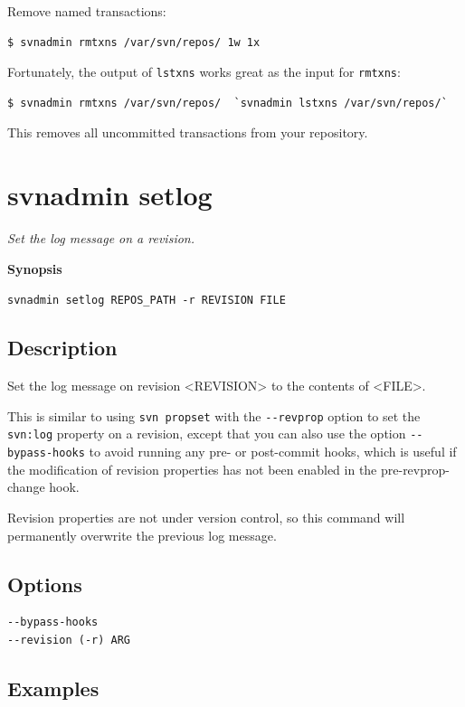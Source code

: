 Remove named transactions:

\begin{verbatim}
$ svnadmin rmtxns /var/svn/repos/ 1w 1x
\end{verbatim}

Fortunately, the output of \texttt{lstxns} works great as the input for
\texttt{rmtxns}:

\begin{verbatim}
$ svnadmin rmtxns /var/svn/repos/  `svnadmin lstxns /var/svn/repos/`
\end{verbatim}

This removes all uncommitted transactions from your repository.

\section{svnadmin setlog}\label{svn.ref.svnadmin.c.setlog}

\emph{Set the log message on a revision.}

\textbf{Synopsis}

\texttt{svnadmin\ setlog\ REPOS\_PATH\ -r\ REVISION\ FILE}

\subsection{Description}

Set the log message on revision \textless REVISION\textgreater{} to the
contents of \textless FILE\textgreater.

This is similar to using \texttt{svn\ propset} with the
\texttt{-\/-revprop} option to set the \texttt{svn:log} property on a
revision, except that you can also use the option
\texttt{-\/-bypass-hooks} to avoid running any pre- or post-commit
hooks, which is useful if the modification of revision properties has
not been enabled in the pre-revprop-change hook.

Revision properties are not under version control, so this command will
permanently overwrite the previous log message.

\subsection{Options}

\begin{verbatim}
--bypass-hooks
--revision (-r) ARG
\end{verbatim}

\subsection{Examples}

